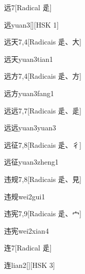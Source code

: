 \begin{entry}{远}{7}[Radical ⾡]
  \begin{phonetics}{远}{yuan3}[][HSK 1]
  \end{phonetics}
\end{entry}

\begin{entry}{远天}{7,4}[Radicais ⾡、⼤]
  \begin{phonetics}{远天}{yuan3tian1}
  \end{phonetics}
\end{entry}

\begin{entry}{远方}{7,4}[Radicais ⾡、⽅]
  \begin{phonetics}{远方}{yuan3fang1}
  \end{phonetics}
\end{entry}

\begin{entry}{远远}{7,7}[Radicais ⾡、⾡]
  \begin{phonetics}{远远}{yuan3yuan3}
  \end{phonetics}
\end{entry}

\begin{entry}{远征}{7,8}[Radicais ⾡、⼻]
  \begin{phonetics}{远征}{yuan3zheng1}
  \end{phonetics}
\end{entry}

\begin{entry}{违规}{7,8}[Radicais ⾡、⾒]
  \begin{phonetics}{违规}{wei2gui1}
  \end{phonetics}
\end{entry}

\begin{entry}{违宪}{7,9}[Radicais ⾡、⼧]
  \begin{phonetics}{违宪}{wei2xian4}
  \end{phonetics}
\end{entry}

\begin{entry}{连}{7}[Radical ⾡]
  \begin{phonetics}{连}{lian2}[][HSK 3]
  \end{phonetics}
\end{entry}

